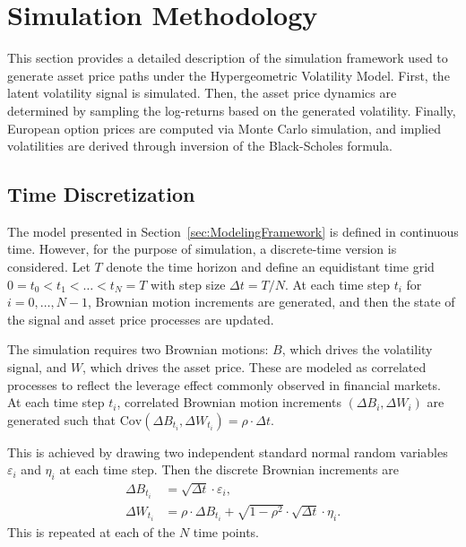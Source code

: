 \section{Simulation Methodology} \label{sec:SimulationMethodology}

This section provides a detailed description of the simulation framework used to generate asset price paths under the Hypergeometric Volatility Model. First, the latent volatility signal is simulated. Then, the asset price dynamics are determined by sampling the log-returns based on the generated volatility. Finally, European option prices are computed via Monte Carlo simulation, and implied volatilities are derived through inversion of the Black-Scholes formula.


\subsection{Time Discretization} \label{subsec:TimeDiscretization}

The model presented in Section~\ref{sec:ModelingFramework} is defined in continuous time. However, for the purpose of simulation, a discrete-time version is considered. Let $T$ denote the time horizon and define an equidistant time grid $0 = t_0 < t_1 < \ldots < t_N = T$ with step size $\Delta t = T/N$. At each time step $t_i$ for $i = 0,\ldots,N-1$, Brownian motion increments are generated, and then the state of the signal and asset price processes are updated.

The simulation requires two Brownian motions: $B$, which drives the volatility signal, and $W$, which drives the asset price. These are modeled as correlated processes to reflect the leverage effect commonly observed in financial markets. At each time step $t_i$, correlated Brownian motion increments $(\Delta B_i, \Delta W_i)$ are generated such that $\mathrm{Cov}(\Delta B_{t_i}, \Delta W_{t_i}) = \rho \cdot \Delta t$.

This is achieved by drawing two independent standard normal random variables $\varepsilon_i$ and $\eta_i$ at each time step. Then the discrete Brownian increments are
\begin{align}
    \Delta B_{t_i} &= \sqrt{\Delta t} \cdot \varepsilon_i, \label{eq:BrownianMotions1} \\
    \Delta W_{t_i} &= \rho \cdot \Delta B_{t_i} + \sqrt{1 - \rho^2} \cdot \sqrt{\Delta t} \cdot \eta_i. \label{eq:BrownianMotions2}
\end{align}
This is repeated at each of the $N$ time points.


